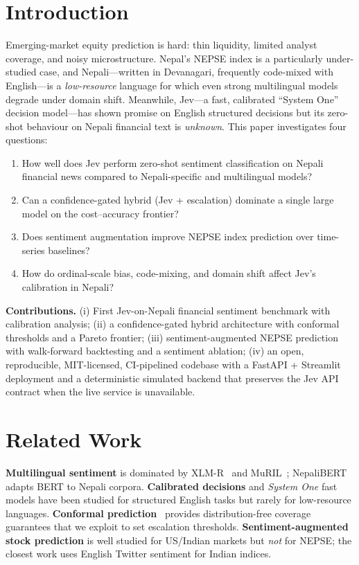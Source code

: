 \documentclass[conference]{IEEEtran}
\begin{document}
\section{Introduction}
Emerging-market equity prediction is hard: thin liquidity, limited analyst
coverage, and noisy microstructure. Nepal's NEPSE index is a particularly
under-studied case, and Nepali---written in Devanagari, frequently
code-mixed with English---is a \emph{low-resource} language for which even
strong multilingual models degrade under domain shift. Meanwhile, Jev---a
fast, calibrated ``System One'' decision model---has shown promise on English
structured decisions but its zero-shot behaviour on Nepali financial text is
\emph{unknown}. This paper investigates four questions:
\begin{enumerate}
  \item How well does Jev perform zero-shot sentiment classification on Nepali
        financial news compared to Nepali-specific and multilingual models?
  \item Can a confidence-gated hybrid (Jev + escalation) dominate a single
        large model on the cost--accuracy frontier?
  \item Does sentiment augmentation improve NEPSE index prediction over
        time-series baselines?
  \item How do ordinal-scale bias, code-mixing, and domain shift affect
        Jev's calibration in Nepali?
\end{enumerate}

\textbf{Contributions.} (i) First Jev-on-Nepali financial sentiment benchmark
with calibration analysis; (ii) a confidence-gated hybrid architecture with
conformal thresholds and a Pareto frontier; (iii) sentiment-augmented NEPSE
prediction with walk-forward backtesting and a sentiment ablation; (iv) an
open, reproducible, MIT-licensed, CI-pipelined codebase with a FastAPI +
Streamlit deployment and a deterministic simulated backend that preserves
the Jev API contract when the live service is unavailable.

\section{Related Work}\label{sec:related}
\textbf{Multilingual sentiment} is dominated by XLM-R~\cite{xlmr2019} and
MuRIL~\cite{muril2021}; NepaliBERT~\cite{nepalibert} adapts BERT to Nepali
corpora. \textbf{Calibrated decisions} and \emph{System One} fast models
have been studied for structured English tasks but rarely for low-resource
languages. \textbf{Conformal prediction}~\cite{vovk2005} provides
distribution-free coverage guarantees that we exploit to set escalation
thresholds. \textbf{Sentiment-augmented stock prediction} is well studied
for US/Indian markets but \emph{not} for NEPSE; the closest work uses
English Twitter sentiment for Indian indices.
\end{document}
